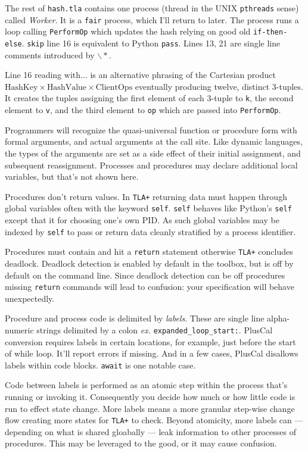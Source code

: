 \documentclass[twocolumn]{article}
\begin{document}
The rest of \texttt{hash.tla} contains one process (thread in the UNIX \texttt{pthreads} sense) called \emph{Worker}. It is a \texttt{fair} process, which I'll return to later. The process runs a loop calling \texttt{PerformOp} which updates the hash relying on good old \texttt{if-then-else}. \texttt{skip} line 16 is equivalent to Python \texttt{pass}. Lines 13, 21 are single line comments introduced by ${\backslash*}$.

Line 16 reading $\text{with}\ldots$ is an alternative phrasing of the Cartesian product $\text{HashKey} \times \text{HashValue} \times \text{ClientOps}$ eventually producing twelve, distinct 3-tuples. It creates the tuples assigning the first element of each 3-tuple to \texttt{k}, the second element to \texttt{v}, and the third element to \texttt{op} which are passed into \texttt{PerformOp}.

Programmers will recognize the quasi-universal function or procedure form with formal arguments, and actual arguments at the call site. Like dynamic languages, the types of the arguments are set as a side effect of their initial assignment, and subsequent reassignment. Processes and procedures may declare additional local variables, but that's not shown here. 

Procedures don't return values. In \texttt{TLA+} returning data must happen through global variables often with the keyword \texttt{self}. \texttt{self} behaves like Python's \texttt{self} except that it for choosing one's own PID. As such global variables may be indexed by \texttt{self} to pass or return data cleanly stratified by a process identifier.

Procedures must contain and hit a \texttt{return} statement otherwise \texttt{TLA+} concludes deadlock. Deadlock detection is enabled by default in the toolbox, but is off by default on the command line. Since deadlock detection can be off procedures missing \texttt{return} commands will lead to confusion: your specification will behave unexpectedly. 

Procedure and process code is delimited by \emph{labels}. These are single line alpha-numeric strings delimited by a colon \emph{ex.} \texttt{expanded\_loop\_start:}. PlusCal conversion requires labels in certain locations, for example, just before the start of while loop. It'll report errors if missing. And in a few cases, PlusCal disallows labels within code blocks. \texttt{await} is one notable case.

Code between labels is performed as an atomic step within the process that's running or invoking it. Consequently you decide how much or how little code is run to effect state change. More labels means a more granular step-wise change flow creating more states for \texttt{TLA+} to check. Beyond atomicity, more labels can --- depending on what is shared gloabally --- leak information to other processes of procedures. This may be leveraged to the good, or it may cause confusion.
\end{document}
